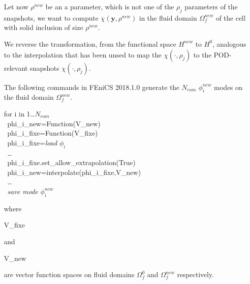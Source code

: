 
\etoile
Let now $\rho^{new}$ be an a parameter, which is not one of the $\rho_j$ parameters of the snapshots, %
we want to compute $\chi(\mathbf{y},\rho^{new})$ in the fluid domain $\Omega_f^{new}$ of the cell with solid inclusion of size $\rho^{new}$.


\par
We reverse the transformation, from the functional space $H^{new}$ to $H^0$, %
analogous to the interpolation that has been unsed to map the $\chi(\cdot,\rho_j)$ to the POD-relevant snapshots $\chi (\cdot ,\rho_j)$.

\par
The following commands in FEniCS 2018.1.0 generate the $N_{rom}$ $\phi_i^{new}$ modes on the fluid domain $\Omega_f^{new}$.

\begin{codef}
for i in 1\dots $N_{rom}$\\
%
\ phi\_i\_new=Function(V\_new)\\
\ phi\_i\_fixe=Function(V\_fixe)\\
\ phi\_i\_fixe=\emph{load $\phi_i$}\\
\ \dots \\
\ phi\_i\_fixe.set\_allow\_extrapolation(True)\\
\ phi\_i\_new=interpolate(phi\_i\_fixe,V\_new)\\
\ \dots \\
\ \emph{save mode $\phi_i^{new}$}
\end{codef}

where \begin{code}V\_fixe\end{code} and \begin{code}V\_new\end{code} are vector function spaces on fluid domains $\Omega_f^0$ and $\Omega_f^{new}$ respectively.

